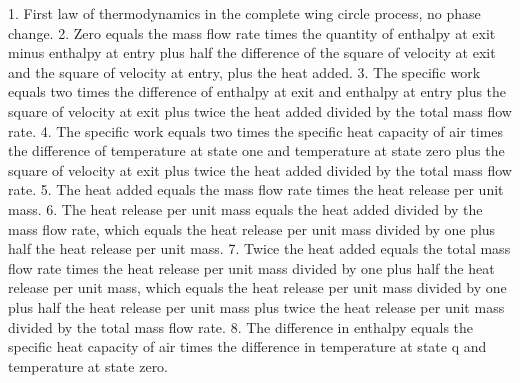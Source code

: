 1. First law of thermodynamics in the complete wing circle process, no phase change.
2. Zero equals the mass flow rate times the quantity of enthalpy at exit minus enthalpy at entry plus half the difference of the square of velocity at exit and the square of velocity at entry, plus the heat added.
3. The specific work equals two times the difference of enthalpy at exit and enthalpy at entry plus the square of velocity at exit plus twice the heat added divided by the total mass flow rate.
4. The specific work equals two times the specific heat capacity of air times the difference of temperature at state one and temperature at state zero plus the square of velocity at exit plus twice the heat added divided by the total mass flow rate.
5. The heat added equals the mass flow rate times the heat release per unit mass.
6. The heat release per unit mass equals the heat added divided by the mass flow rate, which equals the heat release per unit mass divided by one plus half the heat release per unit mass.
7. Twice the heat added equals the total mass flow rate times the heat release per unit mass divided by one plus half the heat release per unit mass, which equals the heat release per unit mass divided by one plus half the heat release per unit mass plus twice the heat release per unit mass divided by the total mass flow rate.
8. The difference in enthalpy equals the specific heat capacity of air times the difference in temperature at state q and temperature at state zero.